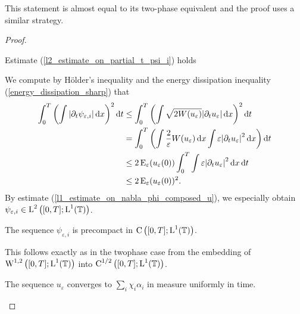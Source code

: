 \begin{remark}
	This statement is almost equal to its two-phase equivalent 
	 and the proof uses a similar strategy.
\end{remark}

\begin{proof}
	\begin{description}[wide=0pt]
		\item[Step 1:] Estimate (\ref{l2_estimate_on_partial_t_psi_i}) holds
		
		We compute by Hölder's inequality and the energy dissipation inequality 
		(\ref{energy_dissipation_sharp}) that
		\begin{align*}
			\int_{ 0 }^{ T }
				\left(
					\int
						\abs{ \partial_{ t } \psi_{ \varepsilon , i } }
					\dd{ x }
				\right)^{ 2 }
			\dd{ t }
			& \leq
			\int_{ 0 }^{ T }
				\left(
					\int
						\sqrt{ 2 W ( u_{ \varepsilon } ) }
						\abs{ \partial_{ t } u_{ \varepsilon } }
					\dd{ x }
				\right)^{ 2 }
			\dd{ t }
			\\
			& =
			\int_{ 0 }^{ T }
				\left(
				\int
					\frac{ 2 }{ \varepsilon }
					W ( u_{ \varepsilon } )
				\dd{ x }
				\int
					\varepsilon 
					\abs{ \partial_{ t } u_{ \varepsilon } }^{ 2 }
				\dd{ x }
				\right)
			\dd{ t }
			\\
			& \leq
			2 \operatorname{E}_{ \varepsilon } ( u_{ \varepsilon } ( 0 ) )
			\int_{ 0 }^{ T }
				\int
					\varepsilon 
					\abs{ \partial_{ t } u_{ \varepsilon } }^{ 2 }
				\dd{ x }
			\dd{ t }
			\\
			& \leq
			2 \operatorname{E}_{ \varepsilon } ( u_{ \varepsilon } ( 0 ) )^{ 2 }.
		\end{align*}
		By estimate (\ref{l1_estimate_on_nabla_phi_composed_u}), we especially 
		obtain $ \psi_{ \varepsilon , i } \in \operatorname{L}^{ 2 } \left( [ 0 , T ] ; 
		\operatorname{L}^{ 1 } ( \operatorname{\mathbb{T}} ) \right) $.
		
		\item[Step 2:] The sequence $ \psi_{ \varepsilon, i } $ is precompact 
		in $ \operatorname{C} \left( [ 0 , T ] ; \operatorname{L}^{ 1 } ( \operatorname{\mathbb{T}} ) \right) $.
		
		This follows exactly as in the twophase case from the embedding of 
		$ \operatorname{W}^{ 1 , 2 } \left( [ 0 , T ] ; \operatorname{L}^{ 1 } ( \operatorname{\mathbb{T}} ) \right) $
		into $ \operatorname{C}^{ 1/2 } \left( [ 0 , T ] ; \operatorname{L}^{ 1 } ( \operatorname{\mathbb{T}} ) \right) $.
		
		\item[Step 3:] The sequence $ u_{ \varepsilon } $ converges to $ \sum_{ 
		i } \chi_{ i } \alpha_{ i } $ in measure uniformly in time.
		

\end{description}
\end{proof}
